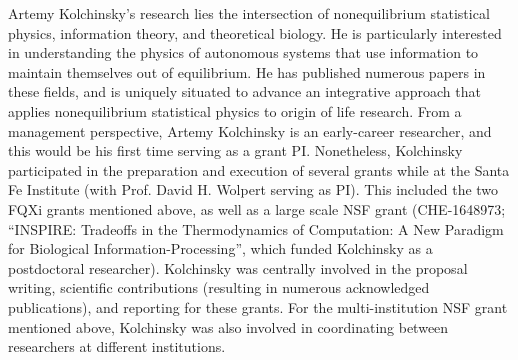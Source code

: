 \documentclass[margin,line,centered,12pt]{res}
\begin{document}
\begin{resume}
Artemy Kolchinsky's research lies the intersection of nonequilibrium statistical physics,  
information theory, and theoretical biology. He is particularly interested in understanding the physics of
 autonomous systems that use information to maintain themselves out of equilibrium. He has published numerous papers in these fields, and is
uniquely situated to advance an integrative approach that applies nonequilibrium statistical physics to origin of life research. 
From a management perspective, Artemy Kolchinsky is an early-career researcher, and this would be his first 
time serving as a grant PI. Nonetheless, Kolchinsky participated in the preparation and execution
of several grants while at the Santa Fe Institute (with Prof. David H. Wolpert serving as PI). 
This included the two FQXi grants mentioned above, 
as well as a large scale NSF 
grant (CHE-1648973; ``INSPIRE: Tradeoffs in the Thermodynamics of Computation:
A New Paradigm for Biological Information-Processing'', which funded Kolchinsky as a 
postdoctoral researcher).  Kolchinsky was centrally involved in
the proposal writing, scientific contributions (resulting in numerous acknowledged publications), and reporting for these grants. For the multi-institution 
NSF grant mentioned above, Kolchinsky was also involved in coordinating between researchers at different institutions.





\end{resume}
\end{document}
